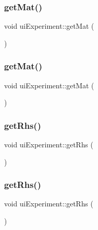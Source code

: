 \subsubsection{\texorpdfstring{get\+Mat()}{getMat()}\hspace{0.1cm}{\footnotesize\ttfamily [1/2]}}
{\footnotesize\ttfamily void ui\+Experiment\+::get\+Mat (\begin{DoxyParamCaption}{ }\end{DoxyParamCaption})}

\mbox{\label{classui_experiment_ad09537c271da486d93b126d06e31dd2f}} 
\subsubsection{\texorpdfstring{get\+Mat()}{getMat()}\hspace{0.1cm}{\footnotesize\ttfamily [2/2]}}
{\footnotesize\ttfamily void ui\+Experiment\+::get\+Mat (\begin{DoxyParamCaption}{ }\end{DoxyParamCaption})}

\mbox{\label{classui_experiment_a1c015a570ae4f2a1c8db01275497753f}} 
\subsubsection{\texorpdfstring{get\+Rhs()}{getRhs()}\hspace{0.1cm}{\footnotesize\ttfamily [1/2]}}
{\footnotesize\ttfamily void ui\+Experiment\+::get\+Rhs (\begin{DoxyParamCaption}{ }\end{DoxyParamCaption})}

\mbox{\label{classui_experiment_a1c015a570ae4f2a1c8db01275497753f}} 
\subsubsection{\texorpdfstring{get\+Rhs()}{getRhs()}\hspace{0.1cm}{\footnotesize\ttfamily [2/2]}}
{\footnotesize\ttfamily void ui\+Experiment\+::get\+Rhs (\begin{DoxyParamCaption}{ }\end{DoxyParamCaption})}

